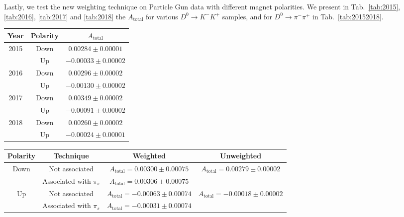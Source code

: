 \documentclass{article}
\begin{document}
        Lastly, we test the new weighting technique on Particle Gun data with different magnet polarities.
        We present in Tab.~\ref{tab:2015}, \ref{tab:2016}, \ref{tab:2017} and \ref{tab:2018} the $A_\text{total}$ for various $D^0\to K^-K^+$ samples, and for $D^0\to \pi^-\pi^+$ in Tab.~\ref{tab:20152018}.
        \begin{center}
                \begin{tabular}{c|c|c}
                        Year & Polarity & $A_\text{total}$\\
                        \hline\hline
                        \multirow{2}{*}{2015} & Down & $0.00284 \pm 0.00001$\\
                        \cline{2-3}
                        & Up & $-0.00033 \pm 0.00002$\\
                        \hline
                        \multirow{2}{*}{2016} & Down & $0.00296 \pm 0.00002$\\
                        \cline{2-3}
                        & Up & $-0.00130\pm 0.00002$\\
                        \hline
                        \multirow{2}{*}{2017} & Down & $0.00349 \pm 0.00002$\\
                        \cline{2-3}
                        & Up & $-0.00091 \pm 0.00002$\\
                        \multirow{2}{*}{2018} & Down & $0.00260 \pm 0.00002$\\
                        & Up & $-0.00024 \pm 0.00001$\\
                \end{tabular}
                \label{tab:20152018}
        \end{center}
        \begin{center}
                \begin{tabular}{c|c|c|c}
                        Polarity & Technique & Weighted & Unweighted\\
                        \hline\hline
                        \multirow{2}{*}{Down} & Not associated & $A_\text{total} = 0.00300 \pm 0.00075$ & \multirow{2}{*}{$A_\text{total} = 0.00279 \pm 0.00002$}\\
                        \cline{2-3}
                        & Associated with $\pi_s$ & $A_\text{total} = 0.00306 \pm 0.00075$ & \\
                        \hline
                        \multirow{2}{*}{Up} & Not associated & $A_\text{total} = - 0.00063 \pm 0.00074$ & \multirow{2}{*}{$A_\text{total} = - 0.00018 \pm 0.00002$}\\
                        \cline{2-3}
                        & Associated with $\pi_s$ & $A_\text{total} = - 0.00031 \pm 0.00074$ & \\
                \end{tabular}
                \label{tab:2015}
        \end{center}
\end{document}
